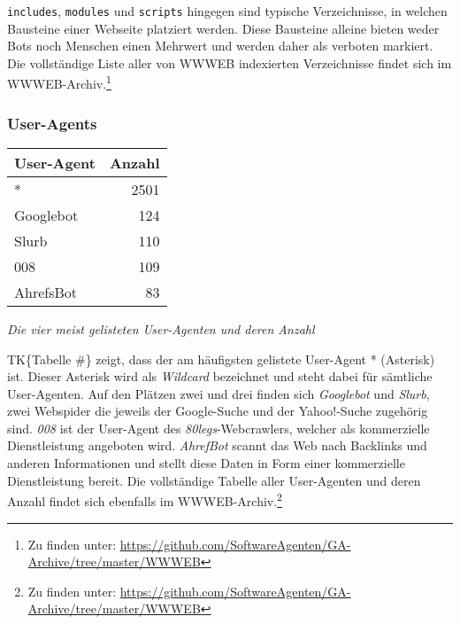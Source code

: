 \texttt{includes}, \texttt{modules} und \texttt{scripts} hingegen sind typische
Verzeichnisse, in welchen Bausteine einer Webseite platziert werden. Diese
Bausteine alleine bieten weder Bots noch Menschen einen Mehrwert und werden
daher als verboten markiert. Die vollständige Liste aller von WWWEB indexierten
Verzeichnisse findet sich im WWWEB-Archiv.\footnote{Zu finden unter:
\url{https://github.com/SoftwareAgenten/GA-Archive/tree/master/WWWEB}}

\subsubsection{User-Agents}
\label{ssub:user-agents}

\begin{tabular}{ l|r }
  \textbf{User-Agent} & \textbf{Anzahl}\\
  \hline
  *         & 2501\\
  Googlebot & 124\\
  Slurb     & 110\\
  008       & 109\\
  AhrefsBot & 83\\
\end{tabular}

\emph{Die vier meist gelisteten User-Agenten und deren Anzahl}

TK\{Tabelle \#\} zeigt, dass der am häufigsten gelistete User-Agent *
(Asterisk) ist. Dieser Asterisk wird als \emph{Wildcard} bezeichnet und steht
dabei für sämtliche User-Agenten. Auf den Plätzen zwei und drei finden sich
\emph{Googlebot} und \emph{Slurb}, zwei Webspider die
jeweils der Google-Suche und der Yahoo!-Suche zugehörig sind. \emph{008} ist
der User-Agent des \emph{80legs}-Webcrawlers, welcher als kommerzielle
Dienstleistung angeboten wird. \emph{AhrefBot} scannt das Web nach Backlinks
und anderen Informationen und stellt diese Daten in Form einer kommerzielle
Dienstleistung bereit. Die vollständige Tabelle aller User-Agenten und deren
Anzahl findet sich ebenfalls im WWWEB-Archiv.\footnote{Zu finden unter:
\url{https://github.com/SoftwareAgenten/GA-Archive/tree/master/WWWEB}}
